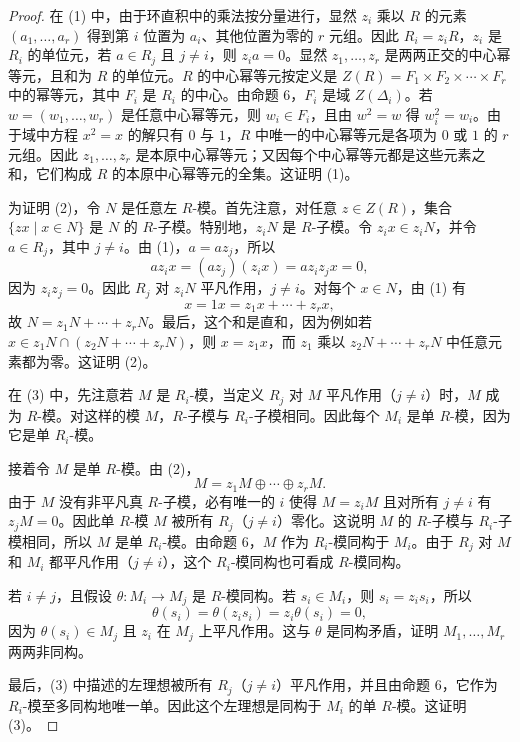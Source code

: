 \begin{proof}
在 (1) 中，由于环直积中的乘法按分量进行，显然 $z_i$ 乘以 $R$ 的元素 $(a_1,
\ldots,a_r)$ 得到第 $i$ 位置为 $a_i$、其他位置为零的 $r$ 元组。因此 $R_i=z_iR$，$z_i$ 是 $R_i$ 的单位元，若 $a\in R_j$ 且 $j\neq i$，则 $z_i a=0$。显然 $z_1,
\ldots,z_r$ 是两两正交的中心幂等元，且和为 $R$ 的单位元。$R$ 的中心幂等元按定义是 $Z(R)=F_1\times F_2\times\cdots\times F_r$ 中的幂等元，其中 $F_i$ 是 $R_i$ 的中心。由命题 6，$F_i$ 是域 $Z(\Delta_i)$。若 $w=(w_1,
\ldots,w_r)$ 是任意中心幂等元，则 $w_i\in F_i$，且由 $w^2=w$ 得 $w_i^2=w_i$。由于域中方程 $x^2=x$ 的解只有 $0$ 与 $1$，$R$ 中唯一的中心幂等元是各项为 $0$ 或 $1$ 的 $r$ 元组。因此 $z_1,
\ldots,z_r$ 是本原中心幂等元；又因每个中心幂等元都是这些元素之和，它们构成 $R$ 的本原中心幂等元的全集。这证明 (1)。

为证明 (2)，令 $N$ 是任意左 $R$-模。首先注意，对任意 $z\in Z(R)$，集合 $\{zx\mid x\in N\}$ 是 $N$ 的 $R$-子模。特别地，$z_iN$ 是 $R$-子模。令 $z_ix\in z_iN$，并令 $a\in R_j$，其中 $j\neq i$。由 (1)，$a=az_j$，所以
\[
  a z_i x=(az_j)(z_i x)=az_i z_jx=0,
\]
因为 $z_i z_j=0$。因此 $R_j$ 对 $z_iN$ 平凡作用，$j\neq i$。对每个 $x\in N$，由 (1) 有
\[
  x=1x=z_1x+\cdots+z_rx,
\]
故 $N=z_1N+\cdots+z_rN$。最后，这个和是直和，因为例如若 $x\in z_1N\cap(z_2N+\cdots+z_rN)$，则 $x=z_1x$，而 $z_1$ 乘以 $z_2N+\cdots+z_rN$ 中任意元素都为零。这证明 (2)。

在 (3) 中，先注意若 $M$ 是 $R_i$-模，当定义 $R_j$ 对 $M$ 平凡作用（$j\neq i$）时，$M$ 成为 $R$-模。对这样的模 $M$，$R$-子模与 $R_i$-子模相同。因此每个 $M_i$ 是单 $R$-模，因为它是单 $R_i$-模。

接着令 $M$ 是单 $R$-模。由 (2)，
\[
  M=z_1M\oplus\cdots\oplus z_rM.
\]
由于 $M$ 没有非平凡真 $R$-子模，必有唯一的 $i$ 使得 $M=z_iM$ 且对所有 $j\neq i$ 有 $z_jM=0$。因此单 $R$-模 $M$ 被所有 $R_j$（$j\neq i$）零化。这说明 $M$ 的 $R$-子模与 $R_i$-子模相同，所以 $M$ 是单 $R_i$-模。由命题 6，$M$ 作为 $R_i$-模同构于 $M_i$。由于 $R_j$ 对 $M$ 和 $M_i$ 都平凡作用（$j\neq i$），这个 $R_i$-模同构也可看成 $R$-模同构。

若 $i\neq j$，且假设 $\theta:M_i\to M_j$ 是 $R$-模同构。若 $s_i\in M_i$，则 $s_i=z_i s_i$，所以
\[
  \theta(s_i)=\theta(z_i s_i)=z_i\theta(s_i)=0,
\]
因为 $\theta(s_i)\in M_j$ 且 $z_i$ 在 $M_j$ 上平凡作用。这与 $\theta$ 是同构矛盾，证明 $M_1,
\ldots,M_r$ 两两非同构。

最后，(3) 中描述的左理想被所有 $R_j$（$j\neq i$）平凡作用，并且由命题 6，它作为 $R_i$-模至多同构地唯一单。因此这个左理想是同构于 $M_i$ 的单 $R$-模。这证明 (3)。


\end{proof}
